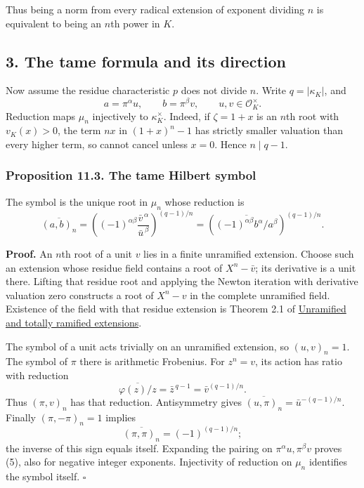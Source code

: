 \documentclass[11pt,a4paper]{article}
\begin{document}
Thus being a norm from every radical extension of exponent dividing
\(n\) is equivalent to being an \(n\)th power in \(K\).

\subsection{3. The tame formula and its
direction}\label{the-tame-formula-and-its-direction}

Now assume the residue characteristic \(p\) does not divide \(n\). Write
\(q=|\kappa_K|\), and \[
a=\pi^\alpha u,\qquad b=\pi^\beta v,\qquad u,v\in\mathcal O_K^\times.
\] Reduction maps \(\mu_n\) injectively to \(\kappa_K^\times\). Indeed,
if \(\zeta=1+x\) is an \(n\)th root with \(v_K(x)>0\), the term \(nx\)
in \((1+x)^n-1\) has strictly smaller valuation than every higher term,
so cannot cancel unless \(x=0\). Hence \(n\mid q-1\).

\subsubsection{Proposition 11.3. The tame Hilbert
symbol}\label{proposition-11.3.-the-tame-hilbert-symbol}

The symbol is the unique root in \(\mu_n\) whose reduction is \[
\overline{(a,b)_n}
 =\left((-1)^{\alpha\beta}
          \frac{\bar v^{\,\alpha}}{\bar u^{\,\beta}}\right)^{(q-1)/n}
 =\left(\overline{(-1)^{\alpha\beta}b^\alpha/a^\beta}\right)^{(q-1)/n}.
\tag{5}
\]

\textbf{Proof.} An \(n\)th root of a unit \(v\) lies in a finite
unramified extension. Choose such an extension whose residue field
contains a root of \(X^n-\bar v\); its derivative is a unit there.
Lifting that residue root and applying the Newton iteration with
derivative valuation zero constructs a root of \(X^n-v\) in the complete
unramified field. Existence of the field with that residue extension is
Theorem 2.1 of
\href{https://kokunoyumeto.github.io/open-math-courses/courses/NT-CFT/proof-dependencies.html\#NT-LOC-07}{Unramified
and totally ramified extensions}.

The symbol of a unit acts trivially on an unramified extension, so
\((u,v)_n=1\). The symbol of \(\pi\) there is arithmetic Frobenius. For
\(z^n=v\), its action has ratio with reduction \[
\overline{\varphi(z)/z}=\bar z^{\,q-1}
          =\bar v^{(q-1)/n}.
\] Thus \((\pi,v)_n\) has that reduction. Antisymmetry gives
\(\overline{(u,\pi)_n}=\bar u^{-(q-1)/n}\). Finally \((\pi,-\pi)_n=1\)
implies \[
\overline{(\pi,\pi)_n}=(-1)^{(q-1)/n};
\] the inverse of this sign equals itself. Expanding the pairing on
\(\pi^\alpha u,\pi^\beta v\) proves (5), also for negative integer
exponents. Injectivity of reduction on \(\mu_n\) identifies the symbol
itself. \(\square\)
\end{document}

